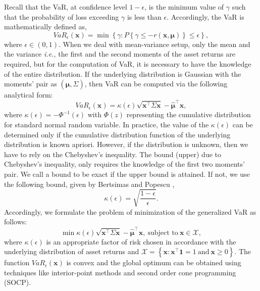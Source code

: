 \documentclass[12pt]{article}
\numberwithin{equation}{section}
\begin{document}
Recall that the VaR, at confidence level $1-\epsilon$, is the minimum value of $\gamma$ such that the probability of loss exceeding $\gamma$ is less
than $\epsilon$. Accordingly, the VaR is mathematically defined as,
\begin{equation}
VaR_{\epsilon}(\mathbf{x})=\min\left\{\gamma:P\left\{\gamma \leq -r(\mathbf{x},\boldsymbol{\mu})\right\} \leq \epsilon \right\},
\label{fig:var_basic}
\end{equation}
where $\epsilon \in (0,1)$. When we deal with mean-variance setup, only the mean and the variance \textit{i.e.,} the first and the second moments of the asset returns are required, but for the computation of VaR, it is necessary to have the knowledge of the entire distribution. If the underlying distribution is Gaussian with the moments' pair as $\displaystyle\left(\hat{\boldsymbol{\mu}},\Sigma\right)$, then VaR can be computed via the following analytical form:
\begin{equation}
VaR_{\epsilon}(\mathbf{x})=\kappa(\epsilon)\sqrt{\mathbf{x}^{\top}\Sigma \mathbf{x}}-\hat{\boldsymbol{\mu}}^{\top}\mathbf{x},
\label{eqn:kappa_eqn}
\end{equation}
where $\displaystyle{\kappa(\epsilon)=-\Phi^{-1}(\epsilon)}$ with $\Phi(z)$ representing the cumulative distribution for standard normal random variable.
In practice, the value of the $\displaystyle{\kappa(\epsilon)}$ can be determined only if the cumulative distribution function of the underlying distribution is known apriori. However, if the distribution is unknown, then we have to rely on the Chebyshev's inequality. The bound (upper) due to Chebyshev's inequality, only requires the knowledge of the first two moments' pair. We call a bound to be exact if the upper bound is attained. If not, we use the following bound, given by Bertsimas and Popescu \cite{Bert05},
\begin{equation}
\kappa(\epsilon)=\sqrt{\frac{1-\epsilon}{\epsilon}}.
\label{fig:kappa_epsilon_def}
\end{equation}
Accordingly, we formulate the problem of minimization of the generalized VaR as follows:
\begin{equation}
\min \kappa(\epsilon)\sqrt{\mathbf{x}^{\top}\Sigma \mathbf{x}}-\hat{\boldsymbol{\mu}}^{\top}\mathbf{x},~\text{subject to}~
\mathbf{x} \in \mathcal{X},
\label{fig:var_general}
\end{equation}
where $\displaystyle{\kappa(\epsilon)}$ is an appropriate factor of risk chosen in accordance with the underlying distribution of asset returns and
$\displaystyle{\mathcal{X}=\left\{\mathbf{x}: \mathbf{x}^{\top}\mathbf{1}=1~\text{and}~\mathbf{x} \geq 0 \right\}}$.
The function $VaR_{\epsilon}(\mathbf{x})$ is convex and the global optimum can be obtained using techniques like interior-point methods and
second order cone programming (SOCP).
\end{document}
